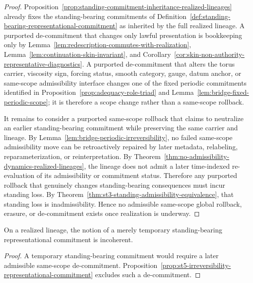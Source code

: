 \begin{proof}
Proposition~\ref{prop:standing-commitment-inheritance-realized-lineages} already fixes the standing-bearing commitments of Definition~\ref{def:standing-bearing-representational-commitment} as inherited by the full realized lineage. A purported de-commitment that changes only lawful presentation is bookkeeping only by Lemma~\ref{lem:redescription-commutes-with-realization}, Lemma~\ref{lem:continuation-skin-invariant}, and Corollary~\ref{cor:skin-non-authority-representative-diagnostics}. A purported de-commitment that alters the torus carrier, viscosity sign, forcing status, smooth category, gauge, datum anchor, or same-scope admissibility interface changes one of the fixed periodic commitments identified in Proposition~\ref{prop:adequacy-role-triad} and Lemma~\ref{lem:bridge-fixed-periodic-scope}; it is therefore a scope change rather than a same-scope rollback.

It remains to consider a purported same-scope rollback that claims to neutralize an earlier standing-bearing commitment while preserving the same carrier and lineage. By Lemma~\ref{lem:bridge-periodic-irreversibility}, no failed same-scope admissibility move can be retroactively repaired by later metadata, relabeling, reparameterization, or reinterpretation. By Theorem~\ref{thm:no-admissibility-dynamics-realized-lineages}, the lineage does not admit a later time-indexed re-evaluation of its admissibility or commitment status. Therefore any purported rollback that genuinely changes standing-bearing consequences must incur standing loss. By Theorem~\ref{thm:st3-standing-admissibility-equivalence}, that standing loss is inadmissibility. Hence no admissible same-scope global rollback, erasure, or de-commitment exists once realization is underway.
\end{proof}

\begin{corollary}\label{cor:no-temporary-standing-bearing-commitment}
On a realized lineage, the notion of a merely temporary standing-bearing representational commitment is incoherent.
\end{corollary}

\begin{proof}
A temporary standing-bearing commitment would require a later admissible same-scope de-commitment. Proposition~\ref{prop:st5-irreversibility-representational-commitment} excludes such a de-commitment.
\end{proof}


